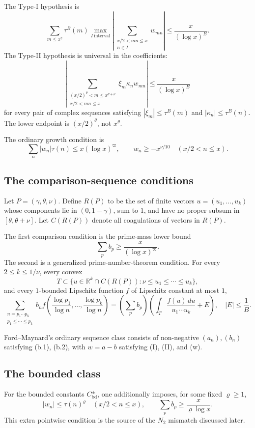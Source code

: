 \documentclass[11pt]{article}
\theoremstyle{definition}
\theoremstyle{remark}
\newcommand{\1}{\mathbf 1}
\begin{document}
The Type-I hypothesis is
\[
 \boxed{
 \sum_{m\le x^\gamma}\tau^B(m)
 \max_{I\ \mathrm{interval}}
 \left|\sum_{\substack{x/2<mn\le x\\ n\in I}}w_{mn}\right|
 \le \frac{x}{(\log x)^B}.}
\tag{I}
\]
The Type-II hypothesis is universal in the coefficients:
\[
 \boxed{
 \left|\sum_{\substack{(x/2)^\theta<m\le x^{\theta+\nu}\\x/2<mn\le x}}
 \xi_m\kappa_n w_{mn}\right|
 \le\frac{x}{(\log x)^B}}
\tag{II}
\]
for every pair of complex sequences satisfying
$|\xi_m|\le\tau^B(m)$ and $|\kappa_n|\le\tau^B(n)$.
The lower endpoint is $(x/2)^\theta$, not $x^\theta$.

The ordinary growth condition is
\[
 \boxed{\sum_n|w_n|\tau(n)\le x(\log x)^\varpi,
 \qquad w_n\ge -x^{\nu/10}\quad(x/2<n\le x).}
\tag{w}
\]

\subsection{The comparison-sequence conditions}

Let $P=(\gamma,\theta,\nu)$.  Define $R(P)$ to be the set of finite vectors
$u=(u_1,\ldots,u_k)$ whose components lie in $(0,1-\gamma)$, sum to $1$, and have no proper subsum in
$[\theta,\theta+\nu]$.  Let $C(R(P))$ denote all coagulations of vectors in $R(P)$.

The first comparison condition is the prime-mass lower bound
\[
 \boxed{\sum_p b_p\ge \frac{x}{(\log x)^\varpi}.}
\tag{b.1}
\]
The second is a generalized prime-number-theorem condition.  For every
$2\le k\le1/\nu$, every convex
\[
 T\subset\{u\in\mathbb R^k\cap C(R(P)):\nu\le u_1\le\cdots\le u_k\},
\]
and every $1$-bounded Lipschitz function $f$ of Lipschitz constant at most $1$,
\[
 \boxed{
 \sum_{\substack{n=p_1\cdots p_k\\p_1\le\cdots\le p_k}}
 b_n f\!\left(\frac{\log p_1}{\log n},\ldots,\frac{\log p_k}{\log n}\right)
 =\left(\sum_p b_p\right)
 \left(\int_T\frac{f(u)\,du}{u_1\cdots u_k}+E\right),
 \quad |E|\le\frac1B.}
\tag{b.2}
\]

Ford--Maynard's ordinary sequence class consists of non-negative $(a_n),(b_n)$ satisfying
(b.1), (b.2), with $w=a-b$ satisfying (I), (II), and (w).

\subsection{The bounded class}

For the bounded constants $C^\pm_{\mathrm{bd}}$, one additionally imposes, for some fixed $\varrho\ge1$,
\[
 \boxed{|w_n|\le\tau(n)^\varrho\quad(x/2<n\le x),
 \qquad\sum_p b_p\ge\frac{x}{\varrho\log x}.}
\tag{4.1}
\]
This extra pointwise condition is the source of the $N_2$ mismatch discussed later.
\end{document}
